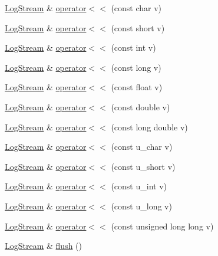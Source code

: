 \begin{DoxyCompactItemize}
\item 
\hyperlink{classkisscpp_1_1_log_stream}{Log\-Stream} \& \hyperlink{classkisscpp_1_1_log_stream_a1d015fcec83dc091a2cb474ff5d335ce}{operator$<$$<$} (const char v)
\item 
\hyperlink{classkisscpp_1_1_log_stream}{Log\-Stream} \& \hyperlink{classkisscpp_1_1_log_stream_a64e3c679c6f5392587aa5d0d30083b12}{operator$<$$<$} (const short v)
\item 
\hyperlink{classkisscpp_1_1_log_stream}{Log\-Stream} \& \hyperlink{classkisscpp_1_1_log_stream_a846256cf761f4601ef3637b6696119d7}{operator$<$$<$} (const int v)
\item 
\hyperlink{classkisscpp_1_1_log_stream}{Log\-Stream} \& \hyperlink{classkisscpp_1_1_log_stream_a82903610e544b37167f2dbd3709feeab}{operator$<$$<$} (const long v)
\item 
\hyperlink{classkisscpp_1_1_log_stream}{Log\-Stream} \& \hyperlink{classkisscpp_1_1_log_stream_adfa23ba1edc6f3d4c68169a0fd5e6ab0}{operator$<$$<$} (const float v)
\item 
\hyperlink{classkisscpp_1_1_log_stream}{Log\-Stream} \& \hyperlink{classkisscpp_1_1_log_stream_a117bd78b19cb5cb22aceda49a7e464a6}{operator$<$$<$} (const double v)
\item 
\hyperlink{classkisscpp_1_1_log_stream}{Log\-Stream} \& \hyperlink{classkisscpp_1_1_log_stream_aaf019e2c591c751cfd6343a1fae8d25c}{operator$<$$<$} (const long double v)
\item 
\hyperlink{classkisscpp_1_1_log_stream}{Log\-Stream} \& \hyperlink{classkisscpp_1_1_log_stream_a093fb47653a508743fbdc8849d0b3289}{operator$<$$<$} (const u\-\_\-char v)
\item 
\hyperlink{classkisscpp_1_1_log_stream}{Log\-Stream} \& \hyperlink{classkisscpp_1_1_log_stream_ac58b43508e33bf908dcd3e1ced0844a5}{operator$<$$<$} (const u\-\_\-short v)
\item 
\hyperlink{classkisscpp_1_1_log_stream}{Log\-Stream} \& \hyperlink{classkisscpp_1_1_log_stream_ac90a6103239d03af4deabb771a06ef72}{operator$<$$<$} (const u\-\_\-int v)
\item 
\hyperlink{classkisscpp_1_1_log_stream}{Log\-Stream} \& \hyperlink{classkisscpp_1_1_log_stream_a30aa88e723ce04fe2e23ce6e939671cf}{operator$<$$<$} (const u\-\_\-long v)
\item 
\hyperlink{classkisscpp_1_1_log_stream}{Log\-Stream} \& \hyperlink{classkisscpp_1_1_log_stream_ae7a5fbc7cc973038722e2c2b9de9ad1b}{operator$<$$<$} (const unsigned long long v)
\item 
\hyperlink{classkisscpp_1_1_log_stream}{Log\-Stream} \& \hyperlink{classkisscpp_1_1_log_stream_a2814d0297db8339779e995c898861e0e}{flush} ()

\end{DoxyCompactItemize}
